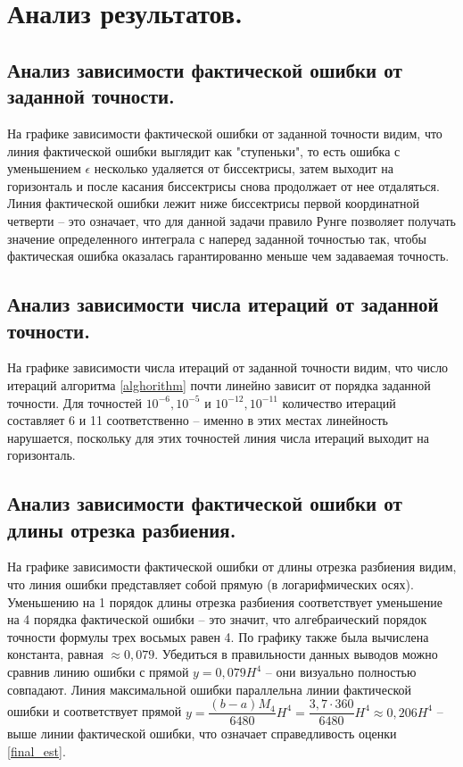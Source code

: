 \documentclass[a4paper, 12pt]{article}
\begin{document}
	\section{Анализ результатов.}
	
	\subsection{Анализ зависимости фактической ошибки от заданной точности.} 
	
	На графике зависимости фактической ошибки от заданной точности видим, что линия фактической ошибки выглядит как "ступеньки", то есть ошибка с уменьшением $\epsilon$ несколько удаляется от биссектрисы, затем выходит на горизонталь и после касания биссектрисы снова продолжает от нее отдаляться. Линия фактической ошибки лежит ниже биссектрисы первой координатной четверти -- это означает, что для данной задачи правило Рунге позволяет получать значение определенного интеграла с наперед заданной точностью так, чтобы фактическая ошибка оказалась гарантированно меньше чем задаваемая точность. 
	
	\subsection{Анализ зависимости числа итераций от заданной точности.}
	
	На графике зависимости числа итераций от заданной точности видим, что число итераций алгоритма \ref{alghorithm} почти линейно зависит от порядка заданной точности. Для точностей $10^{-6},10^{-5}$ и $10^{-12},10^{-11}$ количество итераций составляет 6 и 11 соответственно -- именно в этих местах линейность нарушается, поскольку для этих точностей линия числа итераций выходит на горизонталь.
	
	\subsection{Анализ зависимости фактической ошибки от длины отрезка разбиения.}
	
	На графике зависимости фактической ошибки от длины отрезка разбиения видим, что линия ошибки представляет собой прямую (в логарифмических осях). Уменьшению на 1 порядок длины отрезка разбиения соответствует уменьшение на 4 порядка фактической ошибки -- это значит, что алгебраический порядок точности формулы трех восьмых равен 4. По графику также была вычислена константа, равная $\approx 0,079$. Убедиться в правильности данных выводов можно сравнив линию ошибки с прямой $y=0,079H^4$ -- они визуально полностью совпадают. Линия максимальной ошибки параллельна линии фактической ошибки и соответствует прямой $y=\dfrac{(b-a)M_4}{6480}H^4=\dfrac{3,7\cdot360}{6480}H^4\approx0,206H^4$ -- выше линии фактической ошибки, что означает справедливость оценки \eqref{final_est}.
	
\end{document}
